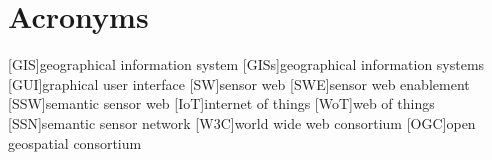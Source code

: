 
\chapter*{Acronyms}

\begin{acronym}[UML]
  [GIS]{geographical information system}
  [GISs]{geographical information systems}
  [GUI]{graphical user interface}
  [SW]{sensor web}
  [SWE]{sensor web enablement}
  [SSW]{semantic sensor web}
  [IoT]{internet of things}
  [WoT]{web of things}
  [SSN]{semantic sensor network}
  [W3C]{world wide web consortium}
  [OGC]{open geospatial consortium}
\end{acronym}